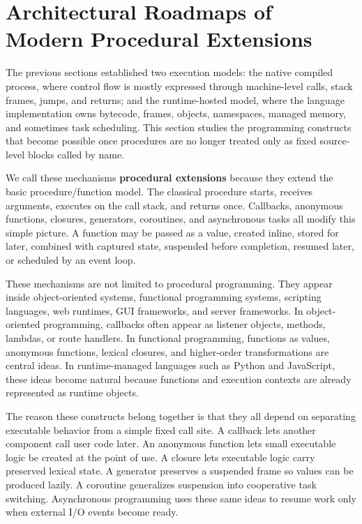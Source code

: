 \section{Architectural Roadmaps of Modern Procedural Extensions}


The previous sections established two execution models: the native compiled process, where control flow is mostly expressed through machine-level calls, stack frames, jumps, and returns; and the runtime-hosted model, where the language implementation owns bytecode, frames, objects, namespaces, managed memory, and sometimes task scheduling. This section studies the programming constructs that become possible once procedures are no longer treated only as fixed source-level blocks called by name.

We call these mechanisms \textbf{procedural extensions} because they extend the basic procedure/function model. The classical procedure starts, receives arguments, executes on the call stack, and returns once. Callbacks, anonymous functions, closures, generators, coroutines, and asynchronous tasks all modify this simple picture. A function may be passed as a value, created inline, stored for later, combined with captured state, suspended before completion, resumed later, or scheduled by an event loop.

These mechanisms are not limited to procedural programming. They appear inside object-oriented systems, functional programming systems, scripting languages, web runtimes, GUI frameworks, and server frameworks. In object-oriented programming, callbacks often appear as listener objects, methods, lambdas, or route handlers. In functional programming, functions as values, anonymous functions, lexical closures, and higher-order transformations are central ideas. In runtime-managed languages such as Python and JavaScript, these ideas become natural because functions and execution contexts are already represented as runtime objects.

The reason these constructs belong together is that they all depend on separating executable behavior from a simple fixed call site. A callback lets another component call user code later. An anonymous function lets small executable logic be created at the point of use. A closure lets executable logic carry preserved lexical state. A generator preserves a suspended frame so values can be produced lazily. A coroutine generalizes suspension into cooperative task switching. Asynchronous programming uses these same ideas to resume work only when external I/O events become ready.

